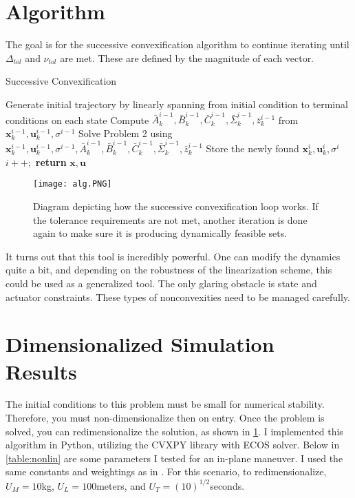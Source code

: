 \documentclass[conf]{new-aiaa}
\begin{document}
\begin{singlespace}
\clearpage
\section{Algorithm}
The goal is for the successive convexification algorithm to continue iterating until $\Delta_{tol}$ and $\nu_{tol}$ are met. These are defined by the magnitude of each vector.

\begin{algorithm}
\caption{Successive Convexification}\label{Successive}
\begin{algorithmic}[1]
\State Generate initial trajectory by linearly spanning from initial condition to terminal conditions on each state
\State Compute $\bar{A}_k^{i-1}, \bar{B}_k^{i-1}, \bar{C}_k^{i-1}, \bar{\Sigma}_k^{i-1}, \bar{z}_k^{i-1}$ from $\mathbf{x}_k^{i-1}, \mathbf{u}_k^{i-1}, \sigma^{i-1}$
\State Solve Problem 2 using $\mathbf{x}_k^{i-1}, \mathbf{u}_k^{i-1}, \sigma^{i-1}, \bar{A}_k^{i-1}, \bar{B}_k^{i-1}, \bar{C}_k^{i-1}, \bar{\Sigma}_k^{i-1}, \bar{z}_k^{i-1}$
\State Store the newly found $\mathbf{x}_k^{i}, \mathbf{u}_k^{i}, \sigma^{i}$
\State $i++;$
\EndWhile 
\State \textbf{return} $\mathbf{x}, \mathbf{u}$
\EndProcedure
\end{algorithmic}
\end{algorithm}


\begin{figure}[!htb] 
  \centering
  \texttt{[image: alg.PNG]}
  \caption{Diagram depicting how the successive convexification loop works. If the tolerance requirements are not met, another iteration is done again to make sure it is producing dynamically feasible sets.}
  \label{fig:succ}
 \end{figure}

It turns out that this tool is incredibly powerful. One can modify the dynamics quite a bit, and depending on the robustness of the linearization scheme, this could be used as a generalized tool. The only glaring obstacle is state and actuator constraints. These types of nonconvexities need to be managed carefully.



\section{Dimensionalized Simulation Results}
The initial conditions to this problem must be small for numerical stability. Therefore, you must non-dimensionalize then on entry. Once the problem is solved, you can redimensionalize the solution, as shown in \ref{fig:succ}. I implemented this algorithm in Python, utilizing the CVXPY library with ECOS solver. Below in \ref{table:nonlin} are some parameters I tested for an in-plane maneuver. I used the same constants and weightings as in \cite{6dofsucc}. For this scenario, to redimensionalize, $U_M = 10$kg, $U_L=100$meters, and $U_T = (10)^{1/2}$seconds.


\end{singlespace}
\end{document}
